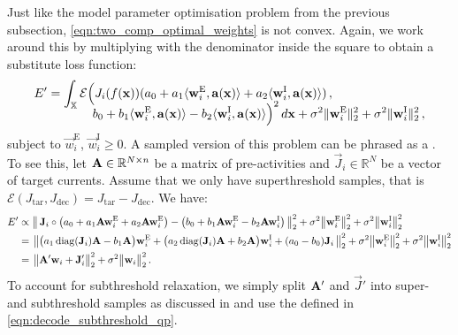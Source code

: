 Just like the model parameter optimisation problem from the previous subsection, \cref{eqn:two_comp_optimal_weights} is not convex.
Again, we work around this by multiplying with the denominator inside the square to obtain a substitute loss function:
\begin{align}
	\begin{aligned}
	E' &=
		\int_{\mathbb{X}} \mathcal{E}
		\Bigl(
			J_i(f(\mathbf{x})) (a_0 + a_1 \langle \mathbf{w}^\mathrm{E}_i, \mathbf{a}(\mathbf{x}) \rangle + a_2 \langle \mathbf{w}^\mathrm{I}_i, \mathbf{a}(\mathbf{x}) \rangle )\,, \\[-1em]
		&\hspace{3.66em}		
		b_0 + b_1 \langle \mathbf{w}^\mathrm{E}_i, \mathbf{a}(\mathbf{x}) \rangle - b_2 \langle \mathbf{w}^\mathrm{I}_i, \mathbf{a}(\mathbf{x}) \rangle
		\Bigr)^2 \, d\mathbf{x}
		 + \sigma^2 \| \mathbf{w}^\mathrm{E}_i \|^2_2 + \sigma^2 \| \mathbf{w}^\mathrm{I}_i \|^2_2 \,,
	\end{aligned}
	\label{eqn:two_comp_optimal_weights_prime}
\end{align}
subject to $\vec w^\mathrm{E}_i$, $\vec w^\mathrm{I}_i \geq 0$.
A sampled version of this problem can be phrased as a \qprog.
To see this, let $\mathbf{A} \in \mathbb{R}^{N \times n}$ be a matrix of pre-activities and $\vec J_i \in \mathbb{R}^{N}$ be a vector of target currents.
Assume that we only have superthreshold samples, that is $\mathcal{E}(J_\mathrm{tar}, J_\mathrm{dec}) = J_\mathrm{tar} - J_\mathrm{dec}$. We have:
\begin{align}
	E' &\propto \bigl\|	\,
		  \mathbf{J}_i \circ
		  	\bigl(
		  		a_0 +
		  		a_1 \mathbf{A} \mathbf{w}_i^\mathrm{E} +
		  		a_2 \mathbf{A} \mathbf{w}_i^\mathrm{E} \bigr)
	      - \bigl(
	      		b_0 +
	      		b_1 \mathbf{A} \mathbf{w}_i^\mathrm{E} -
	      		b_2 \mathbf{A} \mathbf{w}_i^\mathrm{I} \bigr)
	\, \bigr\|_2^2
	+ \sigma^2 \bigl\| \mathbf{w}^\mathrm{E}_i \bigr\|^2_2 + \sigma^2 \bigl\| \mathbf{w}^\mathrm{I}_i \bigr\|^2_2 \notag \\
		&= \hspace{0.125em} \bigl\|
			\bigl(a_1 \operatorname{\mathrm{diag}}(\mathbf{J}_i) \mathbf{A} - b_1 \mathbf{A} \bigr) \mathbf{w}_i^\mathrm{E}
			+ \bigl(a_2 \operatorname{\mathrm{diag}}(\mathbf{J}_i) \mathbf{A} + b_2 \mathbf{A} \bigr) \mathbf{w}_i^\mathrm{I}
			+ (a_0 - b_0) \mathbf{J}_i
	\, \bigr\|_2^2
	+ \sigma^2 \bigl\| \mathbf{w}^\mathrm{E}_i \bigr\|^2_2 
	+ \sigma^2 \bigl\| \mathbf{w}^\mathrm{I}_i \bigr\|^2_2  \notag \\
	&= \hspace{0.125em} \bigl\|
		\mathbf{A}' \mathbf{w}_i + \mathbf{J}_i'
	\bigr\|_2^2
	+ \sigma^2 \bigl\| \mathbf{w}_i \bigr\|^2_2  \,.
	\label{eqn:two_comp_optimal_weights_prime_matrix}
\end{align}
To account for subthreshold relaxation, we simply split $\mathbf{A}'$ and $\vec J'$ into super- and subthreshold samples as discussed in  and use the \QP defined in \cref{eqn:decode_subthreshold_qp}.

